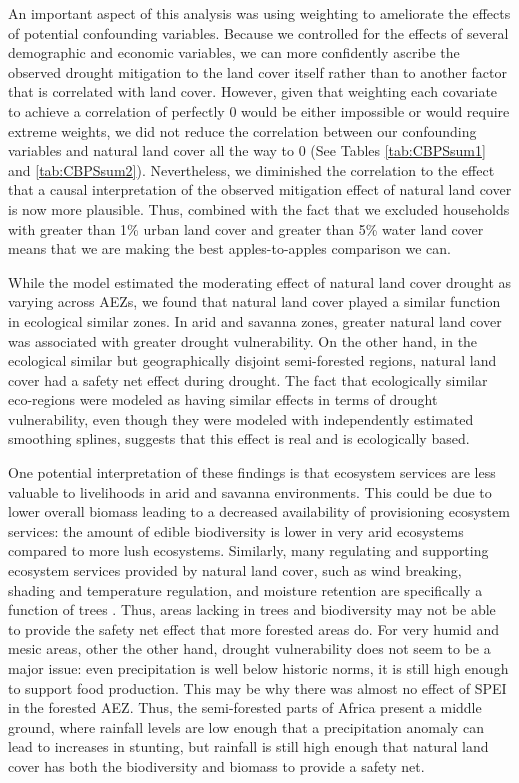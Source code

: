 \documentclass{article}
\begin{document}
An important aspect of this analysis was using weighting to ameliorate the effects of potential confounding variables.  Because we controlled for the effects of several demographic and economic variables, we can more confidently ascribe the observed drought mitigation to the land cover itself rather than to another factor that is correlated with land cover.  However, given that weighting each covariate to achieve a correlation of perfectly 0 would be either impossible or would require extreme weights, we did not reduce the correlation between our confounding variables and natural land cover all the way to 0 (See Tables \ref{tab:CBPSsum1} and \ref{tab:CBPSsum2}).  Nevertheless, we diminished the correlation to the effect that a causal interpretation of the observed mitigation effect of natural land cover is now more plausible.  Thus, combined with the fact that we excluded households with greater than 1\% urban land cover and greater than 5\% water land cover means that we are making the best apples-to-apples comparison we can.

While the model estimated the moderating effect of natural land cover drought as varying across AEZs, we found that natural land cover played a similar function in ecological similar zones.  In arid and savanna zones, greater natural land cover was associated with greater drought vulnerability.  On the other hand, in the ecological similar but geographically disjoint semi-forested regions, natural land cover had a safety net effect during drought.  The fact that ecologically similar eco-regions were modeled as having similar effects in terms of drought vulnerability, even though they were modeled with independently estimated smoothing splines, suggests that this effect is real and is ecologically based.

One potential interpretation of these findings is that ecosystem services are less valuable to livelihoods in arid and savanna environments.  This could be due to lower overall biomass leading to a decreased availability of provisioning ecosystem services: the amount of edible biodiversity is lower in very arid ecosystems compared to more lush ecosystems.  Similarly, many regulating and supporting ecosystem services provided by natural land cover, such as wind breaking, shading and temperature regulation, and moisture retention are specifically a function of trees \cite{Reed2016}. Thus, areas lacking in trees and biodiversity may not be able to provide the safety net effect that more forested areas do.  For very humid and mesic areas, other the other hand, drought vulnerability does not seem to be a major issue: even precipitation is well below historic norms, it is still high enough to support food production.  This may be why there was almost no effect of SPEI in the forested AEZ.  Thus, the semi-forested parts of Africa present a middle ground, where rainfall levels are low enough that a precipitation anomaly can lead to increases in stunting, but rainfall is still high enough that natural land cover has both the biodiversity and biomass to provide a safety net.
\end{document}
